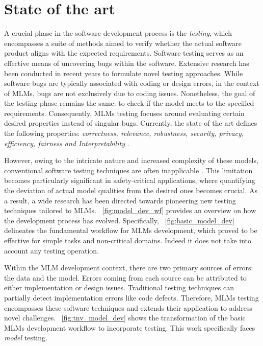 \section{State of the art}

A crucial phase in the software development process is the \textit{testing}, which encompasses a suite of methods aimed to verify whether the actual software product aligns with the expected requirements. Software testing serves as an effective means of uncovering bugs within the software. Extensive research has been conducted in recent years to formulate novel testing approaches. While software bugs are typically associated with coding or design errors, in the context of MLMs, bugs are not exclusively due to coding issues. Nonetheless, the goal of the testing phase remains the same: to check if the model meets to the specified requirements. Consequently, MLMs testing focuses around evaluating certain desired properties instead of singular bugs. Currently, the state of the art defines the following properties: \textit{correctness, relevance, robustness, security, privacy, efficiency, fairness and Interpretability} \cite{zhang2019machine}.

However, owing to the intricate nature and increased complexity of these models, conventional software testing techniques are often inapplicable \cite{VVinef}. This limitation becomes particularly significant in safety-critical applications, where quantifying the deviation of actual model qualities from the desired ones becomes crucial. As a result, a wide research has been directed towards pioneering new testing techniques tailored to MLMs. \Fig~\ref{fig:model_dev_wf} provides an overview on how the development process has evolved. Specifically, \Fig~\ref{fig:basic_model_dev} delineates the fundamental workflow for MLMs development, which proved to be effective for simple tasks and non-critical domains. Indeed it does not take into account any testing operation.

Within the MLM development context, there are two primary sources of errors: the data and the model. Errors coming from each source can be attributed to either implementation or design issues. Traditional testing techniques can partially detect implementation errors like code defects. Therefore, MLMs testing encompasses these software techniques and extends their application to address novel challenges. \Fig~\ref{fig:tnv_model_dev} shows the transformation of the basic MLMs development workflow to incorporate testing. This work specifically faces \textit{model} testing.

